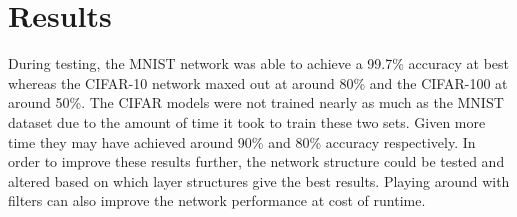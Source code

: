 \documentclass{report}
\theoremstyle{plain} %
\theoremstyle{definition} %
\theoremstyle{plain} %
\begin{document}
\section{Results}
During testing, the MNIST network was able to achieve a 99.7\% accuracy at best whereas the CIFAR-10 network maxed out at around 80\% and the CIFAR-100 at around 50\%. The CIFAR models were not trained nearly as much as the MNIST dataset due to the amount of time it took to train these two sets. Given more time they may have achieved around 90\% and 80\% accuracy respectively. In order to improve these results further, the network structure could be tested and altered based on which layer structures give the best results. Playing around with filters can also improve the network performance at cost of runtime.
\end{document}

